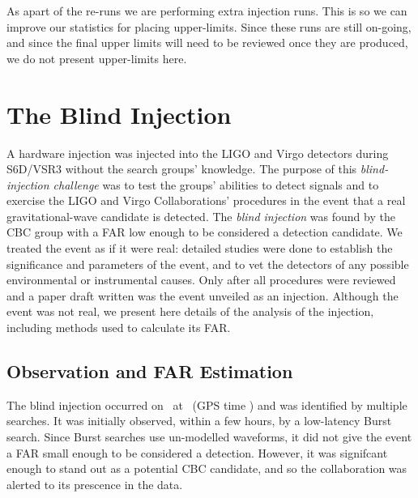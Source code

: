 As apart of the re-runs we are performing extra injection runs. This is so we can improve our statistics for placing upper-limits. Since these runs are still on-going, and since the final upper limits will need to be reviewed once they are produced, we do not present upper-limits here.


\section{The Blind Injection}

A hardware injection was injected into the \ac{LIGO} and Virgo detectors during
S6D/VSR3 without the search groups' knowledge. The purpose of this
\emph{blind-injection challenge} was to test the groups' abilities to detect
signals and to exercise the LIGO and Virgo Collaborations' procedures in the
event that a real gravitational-wave candidate is detected. The {\it blind
injection} was found by the \ac{CBC} group with a FAR low enough to be
considered a detection candidate. We treated the event as if it were real:
detailed studies were done to establish the significance and parameters of the
event, and to vet the detectors of any possible environmental or instrumental
causes. Only after all procedures were reviewed and a paper draft written was
the event unveiled as an injection.  Although the event was not real, we
present here details of the analysis of the injection, including methods used
to calculate its \ac{FAR}.

\subsection{Observation and FAR Estimation}

The blind injection occurred on \dogDate~at \injectedDogTime~(GPS time
\injectedDogGPSTime) and was identified by multiple searches. It was initially
observed, within a few hours, by a low-latency Burst search. Since Burst
searches use un-modelled waveforms, it did not give the event a \ac{FAR} small
enough to be considered a detection. However, it was signifcant enough to stand
out as a potential \ac{CBC} candidate, and so the collaboration was alerted to
its prescence in the data.

